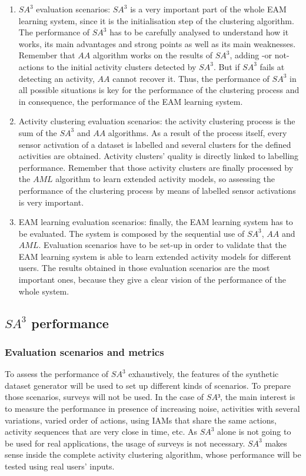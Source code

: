 \begin{enumerate}
 \item $SA^3$ evaluation scenarios: $SA^3$ is a very important part of the whole EAM learning system, since it is the initialisation step of the clustering algorithm. The performance of $SA^3$ has to be carefully analysed to understand how it works, its main advantages and strong points as well as its main weaknesses. Remember that $AA$ algorithm works on the results of $SA^3$, adding -or not- actions to the initial activity clusters detected by $SA^3$. But if $SA^3$ fails at detecting an activity, $AA$ cannot recover it. Thus, the performance of $SA^3$ in all possible situations is key for the performance of the clustering process and in consequence, the performance of the EAM learning system.
 \item Activity clustering evaluation scenarios: the activity clustering process is the sum of the $SA^3$ and $AA$ algorithms. As a result of the process itself, every sensor activation of a dataset is labelled and several clusters for the defined activities are obtained. Activity clusters' quality is directly linked to labelling performance. Remember that those activity clusters are finally processed by the $AML$ algorithm to learn extended activity models, so assessing the performance of the clustering process by means of labelled sensor activations is very important.
 \item EAM learning evaluation scenarios: finally, the EAM learning system has to be evaluated. The system is composed by the sequential use of $SA^3$, $AA$ and $AML$. Evaluation scenarios have to be set-up in order to validate that the EAM learning system is able to learn extended activity models for different users. The results obtained in those evaluation scenarios are the most important ones, because they give a clear vision of the performance of the whole system.
\end{enumerate}

\subsection{$SA^3$ performance}
\label{subsec:evaluation:sa3}

\subsubsection{Evaluation scenarios and metrics}
\label{subsubsec:evaluation:sa3:scenarios}
To assess the performance of $SA^3$ exhaustively, the features of the synthetic dataset generator will be used to set up different kinds of scenarios. To prepare those scenarios, surveys will not be used. In the case of $SA³$, the main interest is to measure the performance in presence of increasing noise, activities with several variations, varied order of actions, using IAMs that share the same actions, activity sequences that are very close in time, etc. As $SA^3$ alone is not going to be used for real applications, the usage of surveys is not necessary. $SA^3$ makes sense inside the complete activity clustering algorithm, whose performance will be tested using real users' inputs.

